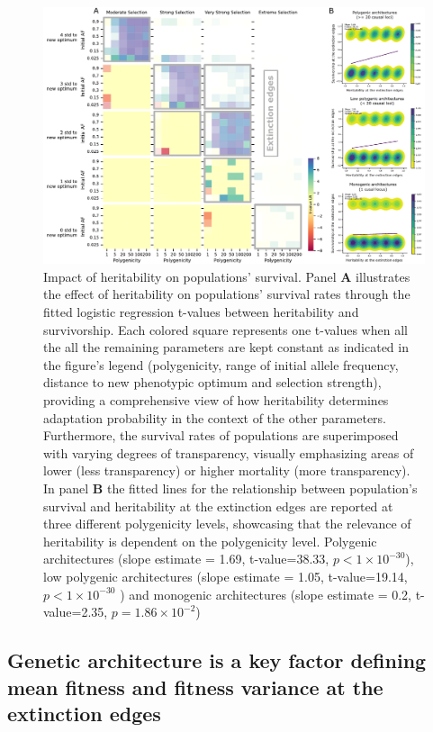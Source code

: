 \documentclass{article}
\begin{document}
\begin{figure}[h]
    \centering
    \includegraphics[width=1\textwidth]{figures/heristabilityvs_survivo_edges.pdf}
    \caption{Impact of heritability on populations' survival. Panel \textbf{A} illustrates the effect of heritability on populations' survival rates through the fitted logistic regression t-values between heritability and survivorship. Each colored square represents one t-values when all the  all the remaining parameters are kept constant as indicated in the figure's legend (polygenicity, range of initial allele frequency, distance to new phenotypic optimum and selection strength), providing a comprehensive view of how heritability determines adaptation probability in the context of the other parameters. Furthermore,  the survival rates of populations are superimposed with varying degrees of transparency, visually emphasizing areas of lower (less transparency) or higher mortality (more transparency). In panel \textbf{B} the fitted lines for the relationship between population's survival and heritability at the extinction edges are reported at three different polygenicity levels, showcasing that the relevance of heritability is dependent on the polygenicity level. Polygenic architectures (slope estimate = 1.69, t-value=38.33,  $p<1 \times 10^{-30}$), low polygenic architectures (slope estimate = 1.05, t-value=19.14,  $p<1 \times 10^{-30}$ ) and monogenic architectures (slope estimate = 0.2, t-value=2.35,  $p=1.86 \times 10^{-2}$)}
    \label{fig:h2_panel_figure}
\end{figure}

\subsection{Genetic architecture is a key factor defining mean fitness and fitness variance at the extinction edges}
\end{document}
